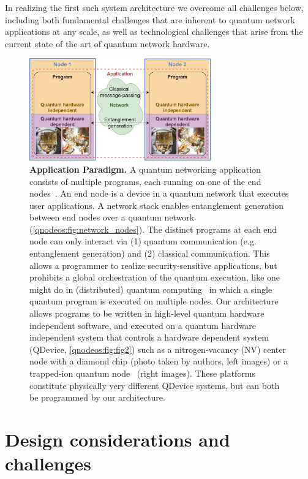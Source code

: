 In realizing the first such system architecture we overcome all challenges below, including both fundamental challenges that are inherent to quantum network applications at any scale, as well as technological challenges that arise from the current state of the art of quantum network hardware.

\begin{figure}[t]
\centering
\includegraphics[width=0.7\textwidth]{figures/qnodeos/main/fig1/fig1.png}
\caption{\textbf{Application Paradigm.}
A quantum networking application consists of multiple programs, each running on one of the end nodes~\cite{dahlberg_2022_netqasm}.
An end node is a device in a quantum network that executes user applications.
A network stack enables entanglement generation between end nodes over a quantum network (\cref{qnodeos:fig:network_nodes}).
The distinct programs at each end node can only interact via (1) quantum communication (e.g. entanglement generation) and (2) classical communication.
This allows a programmer to realize security-sensitive applications, but prohibits a global orchestration of the quantum execution, like one might do in (distributed) quantum computing~\cite{caleffi_distributed_2022} in which a single quantum program is executed on multiple nodes.
Our architecture allows programs to be written in high-level quantum hardware independent software, and executed on a quantum hardware independent system  that controls a hardware dependent system (QDevice, \cref{qnodeos:fig:fig2}) such as a nitrogen-vacancy (NV) center node with a diamond chip (photo taken by authors, left images) or a trapped-ion quantum node~\cite{teller2023integrating} (right images).
These platforms constitute physically very different QDevice systems, but can both be programmed by our architecture.}
\label{qnodeos:fig:fig1}
\end{figure}




\section{Design considerations and challenges}
